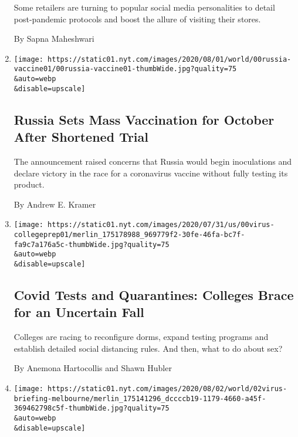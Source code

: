 \begin{enumerate}
  Some retailers are turning to popular social media personalities to
  detail post-pandemic protocols and boost the allure of visiting their
  stores.

  By Sapna Maheshwari
\item
  \href{/2020/08/02/world/europe/russia-trials-vaccine-October.html}{}

  \texttt{[image: https://static01.nyt.com/images/2020/08/01/world/00russia-vaccine01/00russia-vaccine01-thumbWide.jpg?quality=75\\\&auto=webp\\\&disable=upscale]}

  \hypertarget{russia-sets-mass-vaccination-for-october-after-shortened-trial}{%
  \subsection{Russia Sets Mass Vaccination for October After Shortened
  Trial}\label{russia-sets-mass-vaccination-for-october-after-shortened-trial}}

  The announcement raised concerns that Russia would begin inoculations
  and declare victory in the race for a coronavirus vaccine without
  fully testing its product.

  By Andrew E. Kramer
\item
  \href{/2020/08/02/us/covid-college-reopening.html}{}

  \texttt{[image: https://static01.nyt.com/images/2020/07/31/us/00virus-collegeprep01/merlin\_175178988\_969779f2-30fe-46fa-bc7f-fa9c7a176a5c-thumbWide.jpg?quality=75\\\&auto=webp\\\&disable=upscale]}

  \hypertarget{covid-tests-and-quarantines-colleges-brace-for-an-uncertain-fall}{%
  \subsection{Covid Tests and Quarantines: Colleges Brace for an
  Uncertain
  Fall}\label{covid-tests-and-quarantines-colleges-brace-for-an-uncertain-fall}}

  Colleges are racing to reconfigure dorms, expand testing programs and
  establish detailed social distancing rules. And then, what to do about
  sex?

  By Anemona Hartocollis and Shawn Hubler
\item
  \href{/video/world/australia/100000007269116/coronavirus-restrictions-melbourne.html}{}

  \texttt{[image: https://static01.nyt.com/images/2020/08/02/world/02virus-briefing-melbourne/merlin\_175141296\_dccccb19-1179-4660-a45f-369462798c5f-thumbWide.jpg?quality=75\\\&auto=webp\\\&disable=upscale]}


\end{enumerate}
